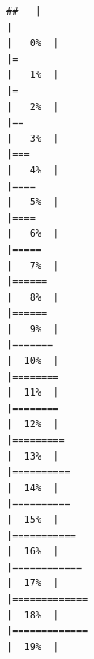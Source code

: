 \documentclass[
]{article}
\begin{document}
\begin{verbatim}
##   |                                                                              |                                                                      |   0%  |                                                                              |=                                                                     |   1%  |                                                                              |=                                                                     |   2%  |                                                                              |==                                                                    |   3%  |                                                                              |===                                                                   |   4%  |                                                                              |====                                                                  |   5%  |                                                                              |====                                                                  |   6%  |                                                                              |=====                                                                 |   7%  |                                                                              |======                                                                |   8%  |                                                                              |======                                                                |   9%  |                                                                              |=======                                                               |  10%  |                                                                              |========                                                              |  11%  |                                                                              |========                                                              |  12%  |                                                                              |=========                                                             |  13%  |                                                                              |==========                                                            |  14%  |                                                                              |==========                                                            |  15%  |                                                                              |===========                                                           |  16%  |                                                                              |============                                                          |  17%  |                                                                              |=============                                                         |  18%  |                                                                              |=============                                                         |  19%  |                                                                              
\end{verbatim}
\end{document}
